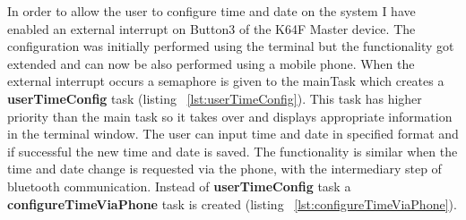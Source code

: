 \documentclass[12pt,a4paper]{article}
\begin{document}
        In order to allow the user to configure time and date on the system I have enabled an external interrupt on Button3 of the K64F Master device. The configuration was initially performed using the terminal but the functionality got extended and can now be also performed using a mobile phone. When the external interrupt occurs a semaphore is given to the mainTask which creates a {\bfseries userTimeConfig} task (listing ~\ref{lst:userTimeConfig}). This task has higher priority than the main task so it takes over and displays appropriate information in the terminal window. The user can input time and date in specified format and if successful the new time and date is saved. The functionality is similar when the time and date change is requested via the phone, with the intermediary step of bluetooth communication. Instead of {\bfseries userTimeConfig} task a {\bfseries configureTimeViaPhone} task is created (listing ~\ref{lst:configureTimeViaPhone}).
        
\end{document}
